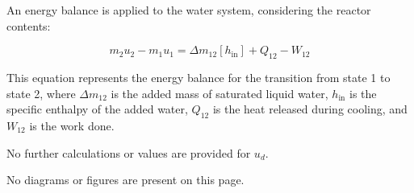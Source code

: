 An energy balance is applied to the water system, considering the reactor contents:  

\[
m_{2} u_{2} - m_{1} u_{1} = \Delta m_{12} [h_{\text{in}}] + Q_{12} - W_{12}
\]

This equation represents the energy balance for the transition from state 1 to state 2, where \( \Delta m_{12} \) is the added mass of saturated liquid water, \( h_{\text{in}} \) is the specific enthalpy of the added water, \( Q_{12} \) is the heat released during cooling, and \( W_{12} \) is the work done.  

No further calculations or values are provided for \( u_d \).  

No diagrams or figures are present on this page.